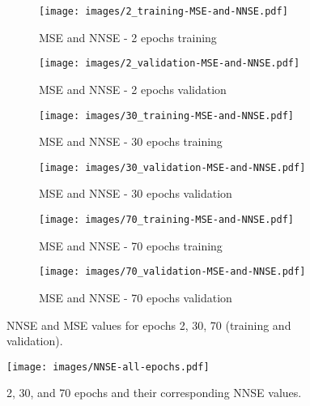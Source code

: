 \documentclass[11pt,twocolumn]{article}
\begin{document}
\begin{figure*}[p]
     \centering
     \begin{subfigure}[b]{0.49\textwidth}
        \centering\texttt{[image: images/2\_training-MSE-and-NNSE.pdf]}
        \caption{MSE and NNSE - 2 epochs training}
        \label{fig:tbd1}
     \end{subfigure}
     \hfill
     \begin{subfigure}[b]{0.49\textwidth}
        \centering\texttt{[image: images/2\_validation-MSE-and-NNSE.pdf]}
        \caption{MSE and NNSE - 2 epochs validation}
        \label{fig:tbd2}
     \end{subfigure}
     \hfill
     \newline
     \begin{subfigure}[b]{0.49\textwidth}
        \centering\texttt{[image: images/30\_training-MSE-and-NNSE.pdf]}
        \caption{MSE and NNSE - 30 epochs training}
        \label{fig:tbd3}
     \end{subfigure}
     \hfill
     \begin{subfigure}[b]{0.49\textwidth}
        \centering\texttt{[image: images/30\_validation-MSE-and-NNSE.pdf]}
        \caption{MSE and NNSE - 30 epochs validation}
        \label{fig:tbd4}
     \end{subfigure}
     \hfill
          \newline
     \hfill
     \begin{subfigure}[b]{0.49\textwidth}
        \centering\texttt{[image: images/70\_training-MSE-and-NNSE.pdf]}
        \caption{MSE and NNSE - 70 epochs training}
        \label{fig:tbd3}
     \end{subfigure}
     \hfill
     \begin{subfigure}[b]{0.49\textwidth}
        \centering\texttt{[image: images/70\_validation-MSE-and-NNSE.pdf]}
        \caption{MSE and NNSE - 70 epochs validation}
        \label{fig:tbd4}
     \end{subfigure}
        \caption{NNSE and MSE values for epochs 2, 30, 70 (training and validation).}
        \label{fig:six graphs}
\end{figure*}

\begin{figure}[htb]
\texttt{[image: images/NNSE-all-epochs.pdf]}
\caption{2, 30, and 70 epochs and their corresponding NNSE values.}
\label{fig:nnse-all-epochs}
\end{figure}
\end{document}
